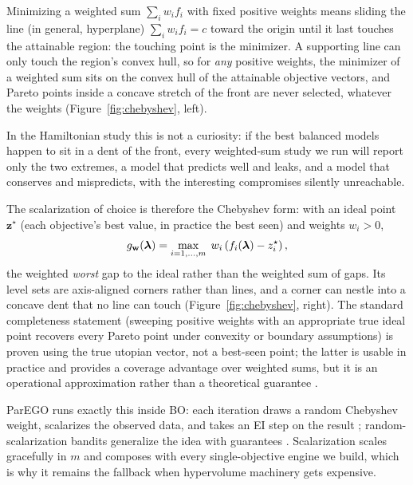 Minimizing a weighted sum
$\sum_i w_i f_i$ with fixed positive weights means sliding the line (in
general, hyperplane) $\sum_i w_i f_i = c$ toward the origin until it last
touches the attainable region: the touching point is the minimizer. A
supporting line can only touch the region's convex hull, so for
\emph{any} positive weights, the minimizer of a weighted sum sits on the
convex hull of the attainable objective vectors, and Pareto points inside
a concave stretch of the front are never selected, whatever the weights
(Figure~\ref{fig:chebyshev}, left).

In the Hamiltonian study this is not
a curiosity: if the best balanced models happen to sit in a dent of the
front, every weighted-sum study we run will report only the two extremes,
a model that predicts well and leaks, and a model that conserves and
mispredicts, with the interesting compromises silently unreachable.

The scalarization of choice is therefore the Chebyshev form: with an
ideal point $\mathbf{z}^{\star}$ (each objective's best value, in
practice the best seen) and weights $w_i > 0$,
\begin{equation}
g_{\mathbf{w}}(\bm{\lambda})
= \max_{i = 1, \dots, m}\; w_i \left( f_i(\bm{\lambda}) - z_i^{\star} \right),
\label{eq:chebyshev}
\end{equation}
the weighted \emph{worst} gap to the ideal rather than the weighted sum
of gaps. Its level sets are axis-aligned corners rather than lines, and a
corner can nestle into a concave dent that no line can touch
(Figure~\ref{fig:chebyshev}, right). The standard completeness statement
(sweeping positive weights with an appropriate true ideal point recovers
every Pareto point under convexity or boundary assumptions) is proven
using the true utopian vector, not a best-seen point; the latter is
usable in practice and provides a coverage advantage over weighted sums,
but it is an operational approximation rather than a theoretical
guarantee \citep{karl2023moo}.

ParEGO runs exactly this inside BO: each iteration
draws a random Chebyshev weight, scalarizes the observed data, and takes
an EI step on the result \citep{knowles2006parego};
random-scalarization bandits generalize the idea with guarantees
\citep{paria2019scalarization}. Scalarization scales gracefully in $m$
and composes with every single-objective engine we build, which is why
it remains the fallback when hypervolume machinery gets expensive.


